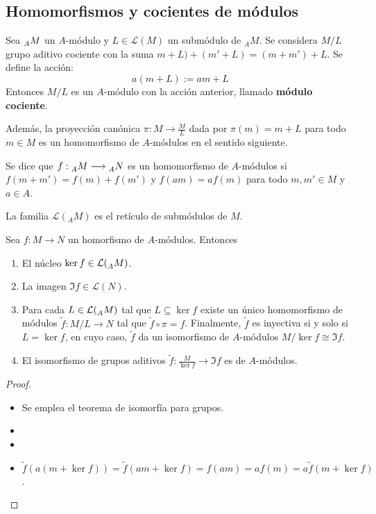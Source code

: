 \subsection{Homomorfismos y cocientes de módulos}

\begin{prop}
  Sea \(\prescript{}{A}{M}\) un \(A\)-módulo y \(L\in\mathcal{L}(M)\) un submódulo
  de \({}_AM\). Se considera \(M/L\) grupo aditivo cociente con la suma
  \(m + L) + (m' + L) = (m + m') + L\). Se define la acción:
  \[
    a(m+L):=am+L
  \]
  Entonces \(M/L\) es un \(A\)-módulo con la acción anterior, llamado
  \textbf{módulo cociente}.
\end{prop}

Además, la proyección canónica \(\pi: M \longrightarrow \frac{M}{L}\) dada por
\(\pi(m) = m + L\) para todo \(m \in M\) es un homomorfismo de \(A\)-módulos en el
sentido siguiente.

\begin{df}
  Se dice que
  \(f:\prescript{}{A}{M}\longrightarrow \prescript{}{A}{N}\)
  es un homomorfismo de \(A\)-módulos si \(f(m + m') = f(m) + f(m')\) y \(f(am) = af(m)\)
  para todo \(m, m' \in M\) y \(a \in A\).
\end{df}

\begin{nt}
  La familia \(\mathcal{L}({}_AM)\) es el retículo de submódulos de \(M\).
\end{nt}

\begin{teo}\label{teo:iso_modulos}
  Sea \(f : M \longrightarrow N\) un homorfismo de \(A\)-módulos. Entonces
  \begin{enumerate}
  \item El núcleo \(\ker f \in \mathcal{L}(\prescript{}{A}{M})\).
  \item La imagen \(\Im f \in \mathcal{L}(N)\).
  \item Para cada \(L \in \mathcal{L}(\prescript{}{A}{M})\) tal que
    \(L \subseteq \ker f\) existe un único homomorfismo de módulos
    \(\tilde{f} : M/L \longrightarrow N\)
    tal que \(\tilde{f}\circ\pi=f\). Finalmente, \(\tilde{f}\) es
    inyectiva si y solo si \(L=\ker f\), en cuyo caso, \(\tilde{f}\)
    da un isomorfismo de \(A\)-módulos
    \(M/\ker f\cong \Im f\).

  \item El isomorfismo de grupos aditivos \(\tilde{f}: \frac{M}{\ker f} \longrightarrow
    \Im f\) es de \(A\)-módulos.
  \end{enumerate}
\end{teo}
\begin{proof}
  \begin{itemize}
  \item Se emplea el teorema de isomorfía para grupos.
  \item
  \item
  \item \(\tilde{f}(a(m + \ker f)) = \tilde{f}(am + \ker f) = f(am) = af(m) =
    a\tilde{f}(m + \ker f)\).
  \end{itemize}
\end{proof}


